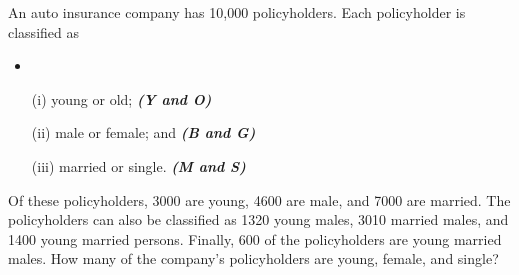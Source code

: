 \documentclass[a4paper,12pt]{article}
\begin{document}
\Large

An auto insurance company has 10,000 policyholders. Each policyholder is classified as
\begin{itemize}
\item 
\item[(i)] young or old;  \textbf{\textit{(Y and O)}}
\item[(ii)] male or female; and  \textbf{\textit{(B and G)}}
\item[(iii)] married or single. \textbf{\textit{(M and S)}}
\end{itemize} 

Of these policyholders, 3000 are young, 4600 are male, and 7000 are married. The 
policyholders can also be classified as 1320 young males, 3010 married males, and 1400 
young married persons. Finally, 600 of the policyholders are young married males. 
How many of the company’s policyholders are young, female, and single? 
\end{document}
